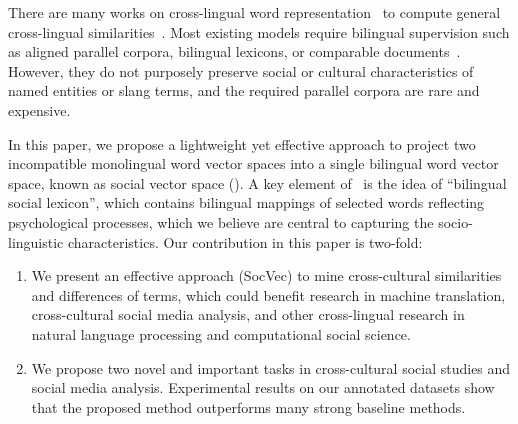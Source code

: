 There are many works on cross-lingual word 
representation~\cite{DBLP:journals/corr/Ruder17} to compute general 
{cross-lingual similarities}~\cite{CamachoCollados2017SemEval2017T2}.
Most existing models require bilingual supervision such as
aligned parallel corpora, bilingual lexicons, or 
comparable documents~\cite{Sarath2014An, kovcisky2014learning, upadhyay2016cross}.
However, they do not purposely preserve social or cultural characteristics 
of named entities or slang terms, and the required parallel corpora are 
rare and expensive. 


In this paper, we propose a lightweight yet effective approach to project 
two incompatible monolingual word vector spaces into 
a single bilingual word vector space, known as 
social vector space (\textit{\socvec}).
A key element of \socvec\ is the idea of ``bilingual social lexicon'', which 
contains bilingual mappings of selected words reflecting  psychological processes, which we believe are central to capturing the socio-linguistic characteristics.
Our contribution in this paper is two-fold: 
\begin{enumerate}[\hspace{0cm}(a)]
	\item We present an effective approach (SocVec) to mine cross-cultural similarities and differences of terms, which could benefit research in machine translation, cross-cultural social media analysis, and other cross-lingual research in natural language processing and computational social science. 
	
	\item We propose two novel and important tasks in cross-cultural social studies and social media analysis. Experimental results on our annotated datasets 
	show that the proposed method outperforms many strong baseline methods.
	
\end{enumerate}

